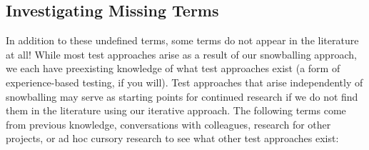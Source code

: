 
\clearpage
\subsection{Investigating Missing Terms}\label{future-miss-terms}
In addition to these undefined terms, some terms do not appear in
the literature at all! While most test approaches arise as a result of our
snowballing approach, we each have preexisting knowledge of what test
approaches exist (a form of experience-based testing, if you will).
Test approaches that arise independently of snowballing may
serve as starting points for continued research if we do not find them in
the literature using our iterative approach. The following terms come from
previous knowledge, conversations with colleagues, research for other
projects, or ad hoc cursory research to see what other test approaches exist:
\newline

